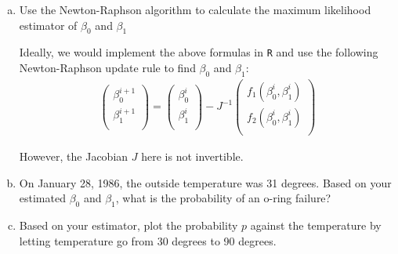 \documentclass[12pt]{article}
\begin{document}
\begin{enumerate}[(a)]
\item Use the Newton-Raphson algorithm to calculate the maximum likelihood estimator of $\beta_0$ and $\beta_1$

Ideally, we would implement the above formulas in \texttt{R} and use the following Newton-Raphson update rule to find $\beta_0$ and $\beta_1$:
\begin{align*}
\left(
\begin{array}{c} 
   \beta_0^{i+1} \\
   \beta_1^{i+1}\\ 
\end{array}
\right)
=
\left(
\begin{array}{c} 
   \beta_0^{i} \\
   \beta_1^{i}\\ 
\end{array}
\right)
- J^{-1} 
\left(
\begin{array}{c} 
   f_1(\beta_0^{i}, \beta_1^{i} ) \\
   f_2(\beta_0^{i}, \beta_1^{i} ) \\
\end{array}
\right)
\end{align*} 

However, the Jacobian $J$ here is not invertible. 


\item On January 28, 1986, the outside temperature was 31 degrees. Based on your estimated $\beta_0$ and $\beta_1$, what is the probability of an o-ring failure?

\item Based on your estimator, plot the probability $p$ against the temperature by letting temperature go from 30 degrees to 90 degrees.

\end{enumerate}
\end{document}
